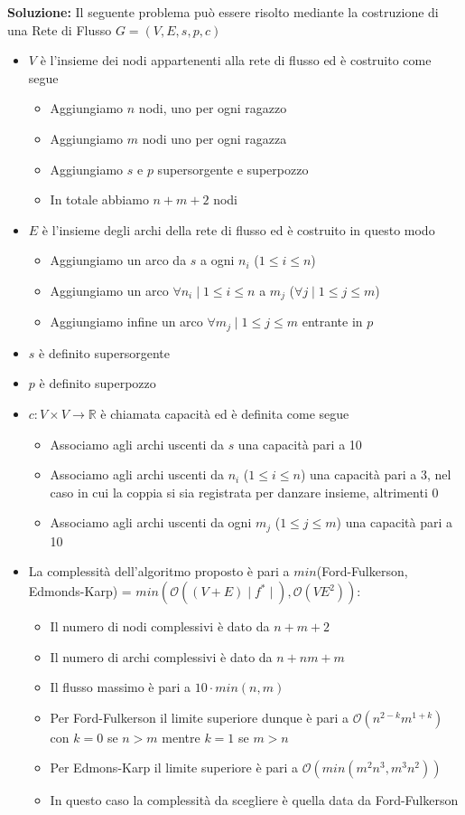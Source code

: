 \documentclass[../cheatSheetAlgoritmi.tex]{subfiles}
\begin{document}
\textbf{Soluzione:} Il seguente problema può essere risolto mediante la costruzione di una Rete di Flusso $G = (V, E, s, p, c)$
\begin{itemize}
	\item $V$ è l'insieme dei nodi appartenenti alla rete di flusso ed è costruito come segue 
	\begin{itemize}
		\item Aggiungiamo $n$ nodi, uno per ogni ragazzo
		\item Aggiungiamo $m$ nodi uno per ogni ragazza
		\item Aggiungiamo $s$ e $p$ supersorgente e superpozzo 
		\item In totale abbiamo $n + m + 2$ nodi
	\end{itemize}
	\item $E$ è l'insieme degli archi della rete di flusso ed è costruito in questo modo
	\begin{itemize}
		\item Aggiungiamo un arco da $s$ a ogni $n_{i}$ ($1 \leq i \leq n$)
		\item Aggiungiamo un arco $\forall n_{i} \mid 1 \leq i \leq n$ a $m_{j}$ ($ \forall j \mid 1\leq j \leq m$)
		\item Aggiungiamo infine un arco $\forall m_{j} \mid 1 \leq j \leq m$ entrante in $p$
	\end{itemize}
	\item $s$ è definito supersorgente
	\item $p$ è definito superpozzo
	\item $c: V \times V \rightarrow \mathbb{R}$ è chiamata capacità ed è definita come segue
	\begin{itemize}
		\item Associamo agli archi uscenti da $s$ una capacità pari a 10
		\item Associamo agli archi uscenti da $n_{i}$ ($1 \leq i \leq n$) una capacità pari a 3, nel caso in cui la coppia si sia registrata per danzare insieme, altrimenti 0
		\item Associamo agli archi uscenti da ogni $m_{j}$ ($1 \leq j \leq m$) una capacità pari a 10
	\end{itemize}
	\item La complessità dell'algoritmo proposto è pari a \hfill \break $min$(Ford-Fulkerson, Edmonds-Karp) = $min(\mathcal{O}((V + E) \mid f^{*} \mid), \mathcal{O}(VE^{2}))$:
		\begin{itemize}
			\item Il numero di nodi complessivi è dato da $n + m + 2$
			\item Il numero di archi complessivi è dato da $n + nm + m$
			\item Il flusso massimo è pari a $10 \cdot min(n,m)$
			\item Per Ford-Fulkerson il limite superiore dunque è pari a $\mathcal{O}(n^{2-k} m^{1+k})$ con $k = 0$ se $n > m$ mentre $k = 1$ se $m > n$
			\item Per Edmons-Karp il limite superiore è pari a $\mathcal{O}(min(m^{2} n^{3}, m^{3} n^{2}))$
			\item In questo caso la complessità da scegliere è quella data da Ford-Fulkerson
		\end{itemize}
\end{itemize}
\end{document}
